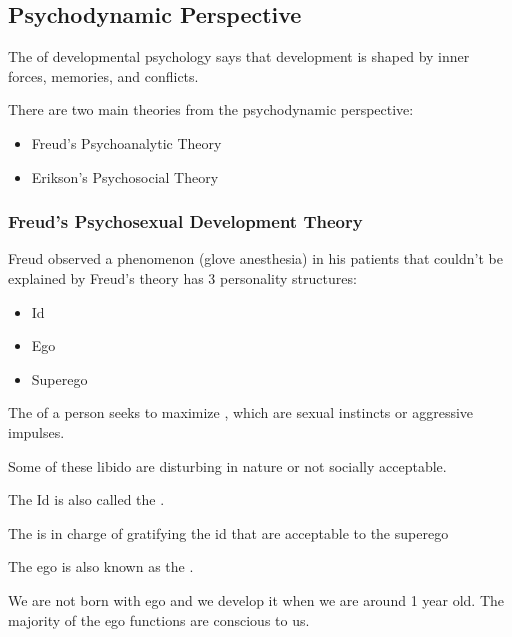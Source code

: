 \documentclass[../main/main.tex]{subfiles}
\begin{document}
\subsection{Psychodynamic Perspective}
\begin{definition}
  The  of developmental psychology says that development is shaped by inner forces, memories, and conflicts.
\end{definition}
There are two main theories from the psychodynamic perspective:
\begin{itemize}
  \item Freud's Psychoanalytic Theory
        \item Erikson’s Psychosocial Theory
\end{itemize}
\subsubsection{Freud's Psychosexual Development Theory}
Freud observed a phenomenon (glove anesthesia) in his patients that couldn't be explained by Freud's theory has 3 personality structures:
\begin{itemize}
  \item Id
        \item Ego
        \item Superego
\end{itemize}

\begin{definition}
   
The  of a person seeks to maximize , which are sexual instincts or aggressive impulses.
\end{definition}
\begin{remark}
Some of these libido are disturbing in nature or not socially acceptable.
\end{remark}
\begin{remark}
  The Id is also called the .
\end{remark}

\begin{definition}
  The  is in charge of gratifying the id that are acceptable to the superego
\end{definition}
\begin{remark}
  The ego is also known as the .
\end{remark}
\begin{remark}
We are not born with ego and we develop it when we are around 1 year old.
The majority of the ego functions are conscious to us.
\end{remark}
\end{document}

